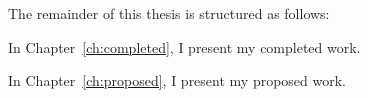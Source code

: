 The remainder of this thesis is structured as follows:


In Chapter~\ref{ch:completed}, I present my completed work.

In Chapter~\ref{ch:proposed}, I present my proposed work.






